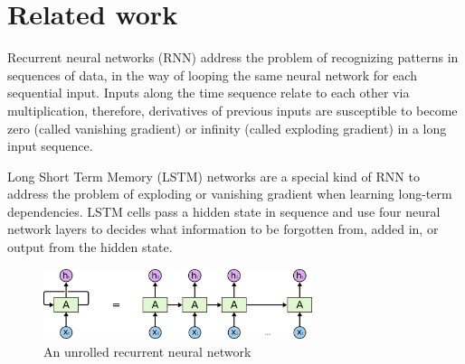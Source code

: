 \documentclass{article}
\begin{document}




\section{Related work}

Recurrent neural networks (RNN) address the problem of recognizing patterns in sequences of data, in the way of looping the same neural network for each sequential input. Inputs along the time sequence relate to each other via multiplication, therefore, derivatives of previous inputs are susceptible to become zero (called vanishing gradient) or infinity (called exploding gradient) in a long input sequence. 

Long Short Term Memory (LSTM)\cite{hochreiter1997long} networks are a special kind of RNN to address the problem of exploding or vanishing gradient when learning long-term dependencies. LSTM cells pass a hidden state in sequence and use four neural network layers to decides what information to be forgotten from, added in, or output from the hidden state.

\begin{figure}[h]
\centering
\includegraphics[width=0.7\textwidth]{rnn}
\caption{An unrolled recurrent neural network\cite{understandLSTM}}
\end{figure}
\end{document}
